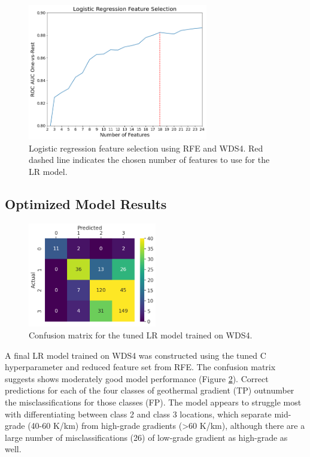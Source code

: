 \begin{figure}[!htp]
\centering
\includegraphics[width=0.70\textwidth]{templates/images/Figure-LR_feature_selection.png}
\singlespacing
\caption[Logistic regression feature selection]{Logistic regression feature selection using RFE and WDS4. Red dashed line indicates the chosen number of features to use for the LR model.}
\label{fig:logreg_rfe}
\end{figure}

\subsection{Optimized Model Results}\label{ch5:lr_results}
\begin{figure}%
\centering
\includegraphics[width=0.5\textwidth]{templates/images/Figure-LR-ConfusionMatrix.png}
\singlespacing
\caption[Logistic regression confusion matrix]{Confusion matrix for the tuned LR model trained on WDS4.}
\label{fig:logreg_conf_matrix}
\end{figure}
A final LR model trained on WDS4 was constructed using the tuned C hyperparameter and reduced feature set from RFE. The confusion matrix suggests shows moderately good model performance (Figure \ref{fig:logreg_conf_matrix}). Correct predictions for each of the four classes of geothermal gradient (TP) outnumber the misclassifications for those classes (FP). The model appears to struggle most with differentiating between class 2 and class 3 locations, which separate mid-grade (40-60 K/km) from high-grade gradients (>60 K/km), although there are a large number of misclassifications (26) of low-grade gradient as high-grade as well.


